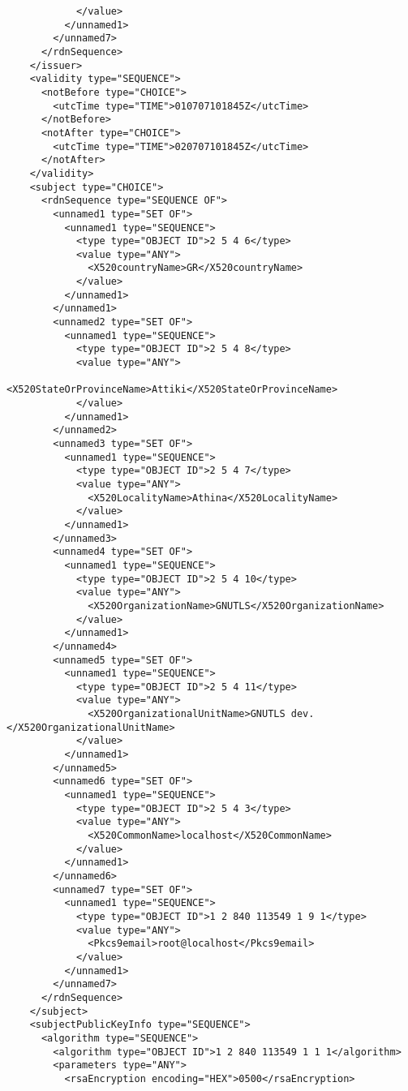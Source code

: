 \begin{verbatim}
            </value>
          </unnamed1>
        </unnamed7>
      </rdnSequence>
    </issuer>
    <validity type="SEQUENCE">
      <notBefore type="CHOICE">
        <utcTime type="TIME">010707101845Z</utcTime>
      </notBefore>
      <notAfter type="CHOICE">
        <utcTime type="TIME">020707101845Z</utcTime>
      </notAfter>
    </validity>
    <subject type="CHOICE">
      <rdnSequence type="SEQUENCE OF">
        <unnamed1 type="SET OF">
          <unnamed1 type="SEQUENCE">
            <type type="OBJECT ID">2 5 4 6</type>
            <value type="ANY">
              <X520countryName>GR</X520countryName>
            </value>
          </unnamed1>
        </unnamed1>
        <unnamed2 type="SET OF">
          <unnamed1 type="SEQUENCE">
            <type type="OBJECT ID">2 5 4 8</type>
            <value type="ANY">
              <X520StateOrProvinceName>Attiki</X520StateOrProvinceName>
            </value>
          </unnamed1>
        </unnamed2>
        <unnamed3 type="SET OF">
          <unnamed1 type="SEQUENCE">
            <type type="OBJECT ID">2 5 4 7</type>
            <value type="ANY">
              <X520LocalityName>Athina</X520LocalityName>
            </value>
          </unnamed1>
        </unnamed3>
        <unnamed4 type="SET OF">
          <unnamed1 type="SEQUENCE">
            <type type="OBJECT ID">2 5 4 10</type>
            <value type="ANY">
              <X520OrganizationName>GNUTLS</X520OrganizationName>
            </value>
          </unnamed1>
        </unnamed4>
        <unnamed5 type="SET OF">
          <unnamed1 type="SEQUENCE">
            <type type="OBJECT ID">2 5 4 11</type>
            <value type="ANY">
              <X520OrganizationalUnitName>GNUTLS dev.</X520OrganizationalUnitName>
            </value>
          </unnamed1>
        </unnamed5>
        <unnamed6 type="SET OF">
          <unnamed1 type="SEQUENCE">
            <type type="OBJECT ID">2 5 4 3</type>
            <value type="ANY">
              <X520CommonName>localhost</X520CommonName>
            </value>
          </unnamed1>
        </unnamed6>
        <unnamed7 type="SET OF">
          <unnamed1 type="SEQUENCE">
            <type type="OBJECT ID">1 2 840 113549 1 9 1</type>
            <value type="ANY">
              <Pkcs9email>root@localhost</Pkcs9email>
            </value>
          </unnamed1>
        </unnamed7>
      </rdnSequence>
    </subject>
    <subjectPublicKeyInfo type="SEQUENCE">
      <algorithm type="SEQUENCE">
        <algorithm type="OBJECT ID">1 2 840 113549 1 1 1</algorithm>
        <parameters type="ANY">
          <rsaEncryption encoding="HEX">0500</rsaEncryption>

\end{verbatim}
